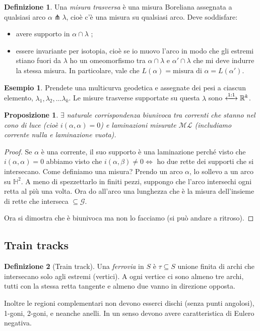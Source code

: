 \documentclass[a4paper]{article}
\newtheorem{proposition}{Proposizione}
\theoremstyle{definition}
\newtheorem{definition}{Definizione}
\newtheorem{example}{Esempio}
\begin{document}
    \begin{definition}
        Una \emph{misura trasversa} è una misura Boreliana assegnata a qualsiasi arco $\alpha \pitchfork \lambda$, cioè c'è una misura su qualsiasi arco. Deve soddisfare:
        \begin{itemize}
            \item avere supporto in $\alpha \cap \lambda$ ;
            \item essere invariante per isotopia, cioè se io muovo l'arco in modo che gli estremi stiano fuori da $\lambda$ ho un omeomorfismo tra $\alpha \cap \lambda$ e $\alpha' \cap \lambda$ che mi deve indurre la stessa misura. In particolare, vale che $L(\alpha) = \textrm{misura di } \alpha = L(\alpha')$.
        \end{itemize}
    \end{definition}

    \begin{example}
        Prendete una multicurva geodetica e assegnate dei pesi a ciascun elemento, $\lambda_1, \lambda_2, \ldots \lambda_k$. Le misure trasverse supportate su questa $\lambda$ sono $\xleftrightarrow{1:1} \mathbb R^k$.
    \end{example}
    
    \begin{proposition}
        $\exists$ naturale corrispondenza biunivoca tra correnti che stanno nel cono di luce (cioè $i(\alpha,\alpha) = 0$) e laminazioni misurate $\mathcal{ML}$ (includiamo corrente nulla e laminazione vuota).
    \end{proposition}
    
    \begin{proof}
        Se $\alpha$ è una corrente, il suo supporto è una laminazione perché visto che $i(\alpha,\alpha) = 0$ abbiamo visto che $i(\alpha,\beta) \neq 0 \iff$ ho due rette dei supporti che si intersecano.
        Come definiamo una misura? Prendo un arco $\alpha$, lo sollevo a un arco su $\mathbb H^2$. A meno di spezzettarlo in finiti pezzi, suppongo che l'arco intersechi ogni retta al più una volta. Ora do all'arco una lunghezza che è la misura dell'insieme di rette che interseca $\subseteq \mathcal G$.

        Ora si dimostra che è biunivoca ma non lo facciamo (si può andare a ritroso).
    \end{proof}
    
    \subsection{Train tracks}
    \begin{definition}[Train track]
        Una \emph{ferrovia} in $S$ è $\tau \subseteq S$ unione finita di archi che intersecano solo agli estremi (vertici). A ogni vertice ci sono almeno tre archi, tutti con la stessa retta tangente e almeno due vanno in direzione opposta.
        
        Inoltre le regioni complementari non devono esserci dischi (senza punti angolosi), 1-goni, 2-goni, e neanche anelli. In un senso devono avere caratteristica di Eulero negativa.
    \end{definition}
        
\end{document}
